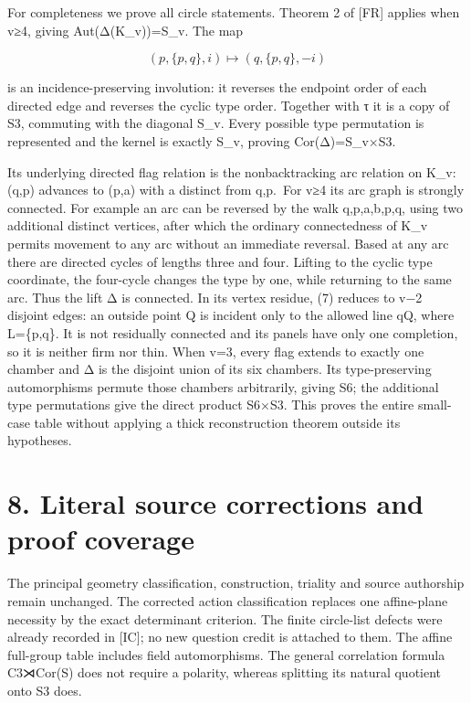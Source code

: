 \documentclass[
  11pt,
  a4paper,
]{article}
\begin{document}
For completeness we prove all circle statements. Theorem 2 of {[}FR{]}
applies when v≥4, giving Aut(Δ(K\_v))=S\_v. The map

\[
 (p,\{p,q\},i)\longmapsto(q,\{p,q\},-i)
\tag{12}
\]

is an incidence-preserving involution: it reverses the endpoint order of
each directed edge and reverses the cyclic type order. Together with τ
it is a copy of S3, commuting with the diagonal S\_v. Every possible
type permutation is represented and the kernel is exactly S\_v, proving
Cor(Δ)=S\_v×S3.

Its underlying directed flag relation is the nonbacktracking arc
relation on K\_v: (q,p) advances to (p,a) with a distinct from q,p.~For
v≥4 its arc graph is strongly connected. For example an arc can be
reversed by the walk q,p,a,b,p,q, using two additional distinct
vertices, after which the ordinary connectedness of K\_v permits
movement to any arc without an immediate reversal. Based at any arc
there are directed cycles of lengths three and four. Lifting to the
cyclic type coordinate, the four-cycle changes the type by one, while
returning to the same arc. Thus the lift Δ is connected. In its vertex
residue, (7) reduces to v−2 disjoint edges: an outside point Q is
incident only to the allowed line qQ, where L=\{p,q\}. It is not
residually connected and its panels have only one completion, so it is
neither firm nor thin. When v=3, every flag extends to exactly one
chamber and Δ is the disjoint union of its six chambers. Its
type-preserving automorphisms permute those chambers arbitrarily, giving
S6; the additional type permutations give the direct product S6×S3. This
proves the entire small-case table without applying a thick
reconstruction theorem outside its hypotheses.

\section{8. Literal source corrections and proof
coverage}\label{literal-source-corrections-and-proof-coverage}

The principal geometry classification, construction, triality and source
authorship remain unchanged. The corrected action classification
replaces one affine-plane necessity by the exact determinant criterion.
The finite circle-list defects were already recorded in {[}IC{]}; no new
question credit is attached to them. The affine full-group table
includes field automorphisms. The general correlation formula C3⋊Cor(S)
does not require a polarity, whereas splitting its natural quotient onto
S3 does.
\end{document}

